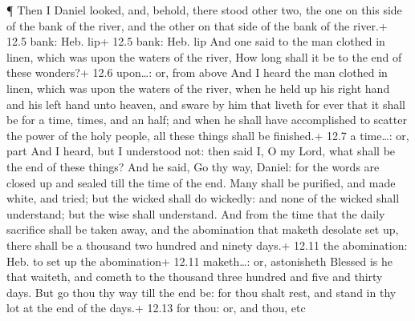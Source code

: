 ¶ Then I Daniel looked, and, behold, there stood other two,
the one on this side of the bank of the river, and the other on that
side of the bank of the river.+ 12.5 bank: Heb. lip+ 12.5 bank: Heb. lip
 And one said to the man clothed in linen, which was upon
the waters of the river, How long shall it be to the end of these
wonders?+ 12.6 upon\ldots: or, from above  And I heard the
man clothed in linen, which was upon the waters of the river, when he
held up his right hand and his left hand unto heaven, and sware by him
that liveth for ever that it shall be for a time, times, and an half;
and when he shall have accomplished to scatter the power of the holy
people, all these things shall be finished.+ 12.7 a time\ldots: or, part
 And I heard, but I understood not: then said I, O my Lord,
what shall be the end of these things?  And he said, Go thy
way, Daniel: for the words are closed up and sealed till the time of the
end.  Many shall be purified, and made white, and tried;
but the wicked shall do wickedly: and none of the wicked shall
understand; but the wise shall understand.  And from the
time that the daily sacrifice shall be taken away, and the abomination
that maketh desolate set up, there shall be a thousand two hundred and
ninety days.+ 12.11 the abomination: Heb. to set up the abomination+
12.11 maketh\ldots: or, astonisheth  Blessed is he that
waiteth, and cometh to the thousand three hundred and five and thirty
days.  But go thou thy way till the end be: for thou shalt
rest, and stand in thy lot at the end of the days.+ 12.13 for thou: or,
and thou, etc
